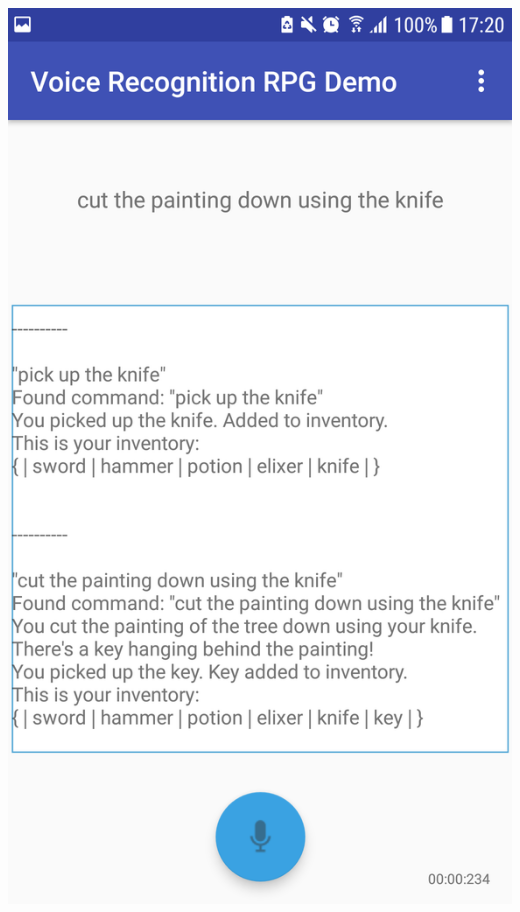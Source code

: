 \documentclass[11pt]{article}
\begin{document}
\begin{center}
\includegraphics[scale=0.18]{overworld-2.png}
\newpage

\end{center}
\end{document}

